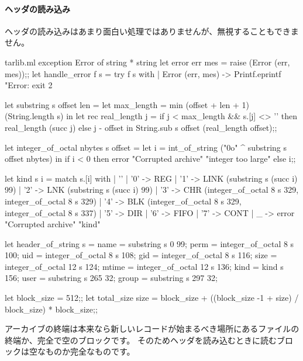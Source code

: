 \paragraph {ヘッダの読み込み}
ヘッダの読み込みはあまり面白い処理ではありませんが、無視することもできません。
%
\begin{listingcodefile}{tarlib.ml}
exception Error of string * string
let error err mes = raise (Error (err, mes));;
let handle_error f s =
  try f s with
  | Error (err, mes) ->
      Printf.eprintf "Error: %
      exit 2

let substring s offset len =
  let max_length = min (offset + len + 1) (String.length s) in
  let rec real_length j =
    if j < max_length && s.[j] <> '' then real_length (succ j)
    else j - offset in
  String.sub s offset (real_length offset);;

let integer_of_octal nbytes s offset =
  let i = int_of_string ("0o" ^ substring s offset nbytes) in
  if i < 0 then error "Corrupted archive" "integer too large" else i;;

let kind s i = match s.[i] with
  | '' | '0' -> REG
  | '1' -> LINK (substring s (succ i) 99)
  | '2' -> LNK (substring s (succ i) 99)
  | '3' -> CHR (integer_of_octal 8 s 329, integer_of_octal 8 s 329)
  | '4' -> BLK (integer_of_octal 8 s 329, integer_of_octal 8 s 337)
  | '5' -> DIR | '6' -> FIFO | '7' -> CONT
  | _ -> error "Corrupted archive" "kind"

let header_of_string s =
  { name = substring s 0 99;
    perm = integer_of_octal 8 s 100;
    uid = integer_of_octal 8 s 108;
    gid = integer_of_octal 8 s 116;
    size = integer_of_octal 12 s 124;
    mtime = integer_of_octal 12 s 136;
    kind = kind s 156;
    user = substring s 265 32;
    group = substring s 297 32; }

let block_size = 512;;
let total_size size =
  block_size + ((block_size -1 + size) / block_size) * block_size;;
\end{listingcodefile}
%
アーカイブの終端は本来なら新しいレコードが始まるべき場所にあるファイルの終端か、完全で空のブロックです。
そのためヘッダを読み込むときに読むブロックは空なものか完全なものです。
